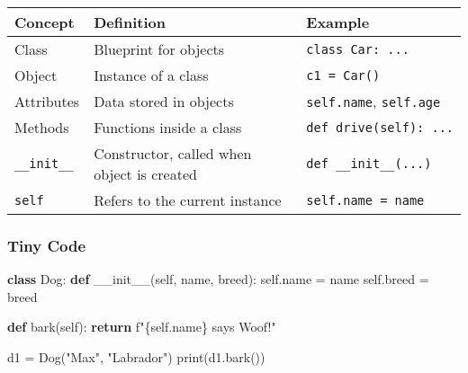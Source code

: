 \documentclass[
  letterpaper,
  DIV=11,
  numbers=noendperiod]{scrreprt}
\newenvironment{Shaded}{\begin{snugshade}}{\end{snugshade}}
\newcommand{\BuiltInTok}[1]{\textcolor[rgb]{0.00,0.23,0.31}{#1}}
\newcommand{\ControlFlowTok}[1]{\textcolor[rgb]{0.00,0.23,0.31}{\textbf{#1}}}
\newcommand{\FunctionTok}[1]{\textcolor[rgb]{0.28,0.35,0.67}{#1}}
\newcommand{\KeywordTok}[1]{\textcolor[rgb]{0.00,0.23,0.31}{\textbf{#1}}}
\newcommand{\NormalTok}[1]{\textcolor[rgb]{0.00,0.23,0.31}{#1}}
\newcommand{\OperatorTok}[1]{\textcolor[rgb]{0.37,0.37,0.37}{#1}}
\newcommand{\SpecialCharTok}[1]{\textcolor[rgb]{0.37,0.37,0.37}{#1}}
\newcommand{\SpecialStringTok}[1]{\textcolor[rgb]{0.13,0.47,0.30}{#1}}
\newcommand{\StringTok}[1]{\textcolor[rgb]{0.13,0.47,0.30}{#1}}
\newcommand{\VariableTok}[1]{\textcolor[rgb]{0.07,0.07,0.07}{#1}}
\begin{document}
\begin{longtable}[]{@{}
  >{\raggedright\arraybackslash}p{}
  >{\raggedright\arraybackslash}p{}
  >{\raggedright\arraybackslash}p{}@{}}
\toprule\noalign{}
\begin{minipage}[b]{\linewidth}\raggedright
Concept
\end{minipage} & \begin{minipage}[b]{\linewidth}\raggedright
Definition
\end{minipage} & \begin{minipage}[b]{\linewidth}\raggedright
Example
\end{minipage} \\
\midrule\noalign{}
\endhead
\bottomrule\noalign{}
\endlastfoot
Class & Blueprint for objects & \texttt{class\ Car:\ ...} \\
Object & Instance of a class & \texttt{c1\ =\ Car()} \\
Attributes & Data stored in objects & \texttt{self.name},
\texttt{self.age} \\
Methods & Functions inside a class & \texttt{def\ drive(self):\ ...} \\
\texttt{\_\_init\_\_} & Constructor, called when object is created &
\texttt{def\ \_\_init\_\_(...)} \\
\texttt{self} & Refers to the current instance &
\texttt{self.name\ =\ name} \\
\end{longtable}

\subsubsection{Tiny Code}\label{tiny-code-60}

\begin{Shaded}
\begin{Highlighting}[]
\KeywordTok{class}\NormalTok{ Dog:}
    \KeywordTok{def} \FunctionTok{\_\_init\_\_}\NormalTok{(}\VariableTok{self}\NormalTok{, name, breed):}
        \VariableTok{self}\NormalTok{.name }\OperatorTok{=}\NormalTok{ name}
        \VariableTok{self}\NormalTok{.breed }\OperatorTok{=}\NormalTok{ breed}
    
    \KeywordTok{def}\NormalTok{ bark(}\VariableTok{self}\NormalTok{):}
        \ControlFlowTok{return} \SpecialStringTok{f"}\SpecialCharTok{\{}\VariableTok{self}\SpecialCharTok{.}\NormalTok{name}\SpecialCharTok{\}}\SpecialStringTok{ says Woof!"}

\NormalTok{d1 }\OperatorTok{=}\NormalTok{ Dog(}\StringTok{"Max"}\NormalTok{, }\StringTok{"Labrador"}\NormalTok{)}
\BuiltInTok{print}\NormalTok{(d1.bark())}
\end{Highlighting}
\end{Shaded}
\end{document}
